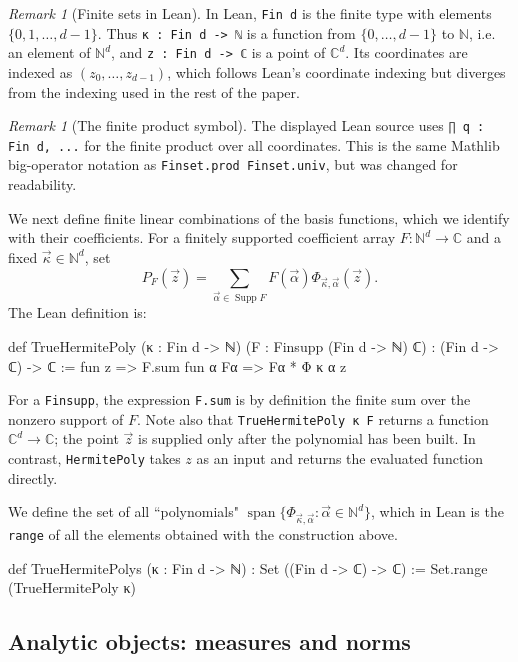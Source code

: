 \documentclass[11pt]{amsart}
\newcommand{\inlean}[1]{{\scriptsize \texttt{#1}}}
\theoremstyle{remark}
\newtheorem{remark}[theorem]{Remark}
\newcommand{\C}{\mathbb{C}}
\newcommand{\N}{\mathbb{N}}
\begin{document}
\begin{remark}[Finite sets in Lean]
    In Lean, {\inlean{Fin d}} is the finite type with elements
    $\{0,1,\ldots,d-1\}$.  Thus {\inlean{κ : Fin d -> ℕ}} is a function from
    $\{0,\ldots,d-1\}$ to $\N$, i.e. an element of $\N^d$, and
    {\inlean{z : Fin d -> ℂ}} is a point of $\C^d$.  Its coordinates are
    indexed as $(z_0,\ldots,z_{d-1})$, which follows Lean's coordinate indexing but diverges from the indexing used in the rest of the paper.
\end{remark}
\begin{remark}[The finite product symbol]
    The displayed Lean source uses {\inlean{∏ q : Fin d, ...}} for the finite
    product over all coordinates.  This is the same Mathlib big-operator
    notation as {\inlean{Finset.prod Finset.univ}}, but was changed for readability.
\end{remark}

We next define finite linear combinations of the basis functions, which we identify with their coefficients.
For a finitely supported coefficient array $F:\mathbb N^d\to\mathbb C$ and a
fixed $\vec\kappa\in\mathbb N^d$, set
\[
    P_F(\vec z)
    = \sum_{\vec\alpha\in \operatorname{Supp}F}
      F(\vec\alpha)\Phi_{\vec\kappa,\vec\alpha}(\vec z).
\]
The Lean definition is:
\begin{leancode}
def TrueHermitePoly (κ : Fin d -> ℕ)
    (F : Finsupp (Fin d -> ℕ) ℂ) : (Fin d -> ℂ) -> ℂ :=
  fun z => F.sum fun α Fα => Fα * Φ κ α z
\end{leancode}
For a {\inlean{Finsupp}}, the expression {\inlean{F.sum}} is by definition the
finite sum over the nonzero support of $F$.  Note also that
{\inlean{TrueHermitePoly κ F}} returns a function $\C^d\to\C$; the point
$\vec z$ is supplied only after the polynomial has been built. In contrast, \inlean{HermitePoly} takes $z$ as an input and returns the evaluated function directly. 
\medskip

We define the set of all ``polynomials" $\operatorname{span}\{\Phi_{\vec\kappa, \vec\alpha} :\vec \alpha \in \N^d\}$, which in Lean is the \inlean{range} of all the elements obtained with the construction above.
\begin{leancode}
def TrueHermitePolys (κ : Fin d -> ℕ) :
    Set ((Fin d -> ℂ) -> ℂ) :=
  Set.range (TrueHermitePoly κ)
\end{leancode}

\subsection{Analytic objects: measures and norms}
\end{document}
